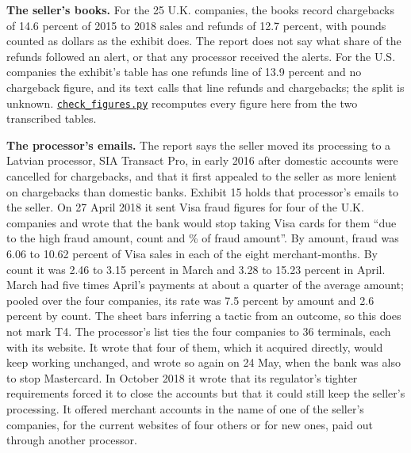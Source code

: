 \documentclass[
  11pt,
]{article}
\begin{document}
\textbf{The seller's books.} For the 25 U.K. companies, the books record
chargebacks of 14.6 percent of 2015 to 2018 sales and refunds of 12.7
percent, with pounds counted as dollars as the exhibit does. The report
does not say what share of the refunds followed an alert, or that any
processor received the alerts. For the U.S. companies the exhibit's
table has one refunds line of 13.9 percent and no chargeback figure, and
its text calls that line refunds and chargebacks; the split is unknown.
\href{tools/receiver_report/check_figures.py}{\texttt{check\_figures.py}}
recomputes every figure here from the two transcribed tables.

\textbf{The processor's emails.} The report says the seller moved its
processing to a Latvian processor, SIA Transact Pro, in early 2016 after
domestic accounts were cancelled for chargebacks, and that it first
appealed to the seller as more lenient on chargebacks than domestic
banks. Exhibit 15 holds that processor's emails to the seller. On 27
April 2018 it sent Visa fraud figures for four of the U.K. companies and
wrote that the bank would stop taking Visa cards for them ``due to the
high fraud amount, count and \% of fraud amount''. By amount, fraud was
6.06 to 10.62 percent of Visa sales in each of the eight
merchant-months. By count it was 2.46 to 3.15 percent in March and 3.28
to 15.23 percent in April. March had five times April's payments at
about a quarter of the average amount; pooled over the four companies,
its rate was 7.5 percent by amount and 2.6 percent by count. The sheet
bars inferring a tactic from an outcome, so this does not mark T4. The
processor's list ties the four companies to 36 terminals, each with its
website. It wrote that four of them, which it acquired directly, would
keep working unchanged, and wrote so again on 24 May, when the bank was
also to stop Mastercard. In October 2018 it wrote that its regulator's
tighter requirements forced it to close the accounts but that it could
still keep the seller's processing. It offered merchant accounts in the
name of one of the seller's companies, for the current websites of four
others or for new ones, paid out through another processor.
\end{document}
